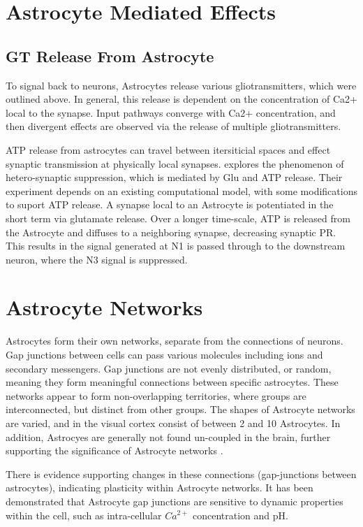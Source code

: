     
    \section{Astrocyte Mediated Effects}
    \subsection{GT Release From Astrocyte}
    To signal back to neurons, Astrocytes release various gliotransmitters,
    which were outlined above. In general, this release is dependent on the
    concentration of Ca2+ local to the synapse. Input pathways converge with
    Ca2+ concentration, and then divergent effects are observed via the release
    of multiple gliotransmitters.

    ATP release from astrocytes can travel between itersiticial spaces and
    effect synaptic transmission at physically local
    synapses. \cite{postnov_2009} explores the phenomenon of hetero-synaptic
    suppression, which is mediated by Glu and ATP release. Their experiment
    depends on an existing computational model, with some modifications to
    suport ATP release. A synapse local to an Astrocyte is potentiated in the
    short term via glutamate release. Over a longer time-scale, ATP is released
    from the Astrocyte and diffuses to a neighboring synapse, decreasing
    synaptic PR. This results in the signal generated at N1 is passed through to
    the downstream neuron, where the N3 signal is suppressed.

        
    \section{Astrocyte Networks}
    Astrocytes form their own networks, separate from the connections of
    neurons. Gap junctions between cells can pass various molecules including
    ions and secondary messengers. Gap junctions are not evenly distributed, or
    random, meaning they form meaningful connections between specific
    astrocytes. These networks appear to form non-overlapping territories, where
    groups are interconnected, but distinct from other
    groups\cite{mederos_2018}. The shapes of Astrocyte networks are varied,
    and in the visual cortex consist of between 2 and 10 Astrocytes. In
    addition, Astrocyes are generally not found un-coupled in the brain, further
    supporting the significance of Astrocyte networks \cite{postnov_2009}.
    
    There is evidence supporting changes in these connections (gap-junctions
    between astrocytes), indicating plasticity within Astrocyte networks. It has
    been demonstrated that Astrocyte gap junctions are sensitive to dynamic
    properties within the cell, such as intra-cellular $Ca^{2+}$ concentration
    and pH. 

